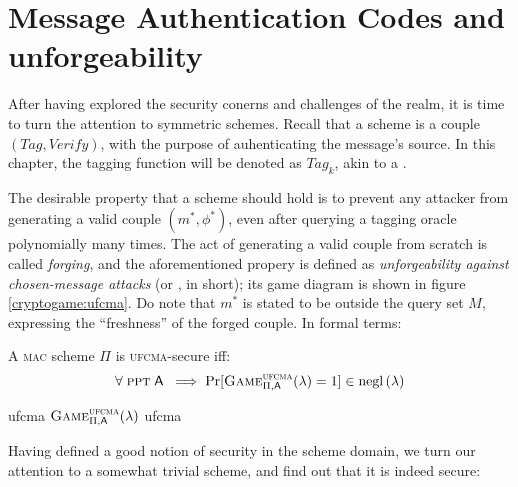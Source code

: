 
\section{Message Authentication Codes and unforgeability}

After having explored the security conerns and challenges of the \ske{} realm, it is time to turn the attention to symmetric \mac{} schemes. Recall that a \mac{} scheme is a couple $(\textit{Tag}, \textit{Verify})$, with the purpose of auhenticating the message's source. In this chapter, the tagging function will be denoted as $\textit{Tag}_k$, akin to a \prf.

The desirable property that a \mac{} scheme should hold is to prevent any attacker from generating a valid couple $(m^*, \phi^*)$, even after querying a tagging oracle polynomially many times\footnotemark.
The act of generating a valid couple from scratch is called \emph{forging}, and the aforementioned propery is defined as \emph{unforgeability against chosen-message attacks} (or \ufcma, in short); its game diagram is shown in figure \ref{cryptogame:ufcma}. Do note that $m^*$ is stated to be outside the query set $M$, expressing the ``freshness'' of the forged couple\footnotemark. In formal terms:


\begin{definition}
    A \textsc{mac} scheme $\Pi$ is \textsc{ufcma}-secure iff:
    \[
        \forall\; \ppt\; \adversary\; \implies \Pr[\cryptog{ufcma}(\lambda) = 1] \in \negl{\lambda}  
    \]
\end{definition}

\begin{cryptogame}
    {ufcma}
    {$\cryptog{ufcma}(\lambda)$}
    {ufcma}


    \cseqbeginloop
    \cseqendloop
    
    \cseqdelay

    
\end{cryptogame}

Having defined a good notion of security in the \mac{} scheme domain, we turn our attention to a somewhat trivial scheme, and find out that it is indeed secure:

